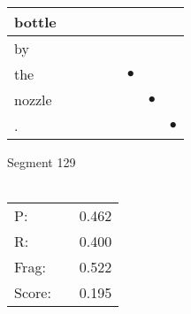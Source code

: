 \documentclass[landscape]{article}
\newcommand{\ssp}{\hspace{2pt}}
\newcommand{\mex}{\cellcolor{g}$\bullet$}
\begin{document}
\begin{tabular}{|l|p{10pt}|p{10pt}|p{10pt}|p{10pt}|p{10pt}|p{10pt}|p{10pt}|}
\hline
\ssp bottle \ssp&\hspace{2pt}&\hspace{2pt}&\hspace{2pt}&\hspace{2pt}&\hspace{2pt}&\hspace{2pt}&\hspace{2pt}\\
\hline
\ssp by \ssp&\hspace{2pt}&\hspace{2pt}&\hspace{2pt}&\hspace{2pt}&\hspace{2pt}&\hspace{2pt}&\hspace{2pt}\\
\hline
\ssp \cellcolor{ref4}the \ssp&\hspace{2pt}&\hspace{2pt}&\hspace{2pt}&\hspace{2pt}&\hspace{2pt}\mex&\hspace{2pt}&\hspace{2pt}\\
\hline
\ssp \cellcolor{ref5}nozzle \ssp&\hspace{2pt}&\hspace{2pt}&\hspace{2pt}&\hspace{2pt}&\hspace{2pt}&\hspace{2pt}\mex&\hspace{2pt}\\
\hline
\ssp \cellcolor{ref6}. \ssp&\hspace{2pt}&\hspace{2pt}&\hspace{2pt}&\hspace{2pt}&\hspace{2pt}&\hspace{2pt}&\hspace{2pt}\mex\\
\hline
\end{tabular}

\vspace{6pt}
\noindent Segment 129\\\\
\noindent\begin{tabular}{lm{12pt}r}
\hline
P:&&0.462\\
R:&&0.400\\
Frag:&&0.522\\
Score:&&0.195\\
\end{tabular}
\end{document}
